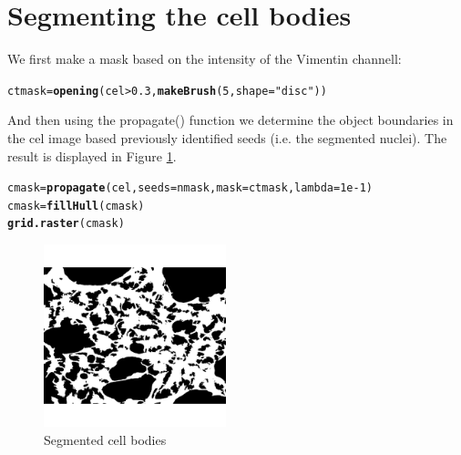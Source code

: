 \documentclass{article}\usepackage[]{graphicx}\usepackage[]{color}
\makeatletter
\newcommand{\hlnum}[1]{\textcolor[rgb]{0.686,0.059,0.569}{#1}}%
\newcommand{\hlstr}[1]{\textcolor[rgb]{0.192,0.494,0.8}{#1}}%
\newcommand{\hlopt}[1]{\textcolor[rgb]{0,0,0}{#1}}%
\newcommand{\hlstd}[1]{\textcolor[rgb]{0.345,0.345,0.345}{#1}}%
\newcommand{\hlkwb}[1]{\textcolor[rgb]{0.69,0.353,0.396}{#1}}%
\newcommand{\hlkwc}[1]{\textcolor[rgb]{0.333,0.667,0.333}{#1}}%
\newcommand{\hlkwd}[1]{\textcolor[rgb]{0.737,0.353,0.396}{\textbf{#1}}}%
\newenvironment{kframe}{%
 \def\at@end@of@kframe{}%
 \ifinner\ifhmode%
  \def\at@end@of@kframe{\end{minipage}}%
  \begin{minipage}{\columnwidth}%
 \fi\fi%
 \def\FrameCommand##1{\hskip\@totalleftmargin \hskip-\fboxsep
 \colorbox{shadecolor}{##1}\hskip-\fboxsep
     \hskip-\linewidth \hskip-\@totalleftmargin \hskip\columnwidth}%
 \MakeFramed {\advance\hsize-\width
   \@totalleftmargin\z@ \linewidth\hsize
   \@setminipage}}%
 {\par\unskip\endMakeFramed%
 \at@end@of@kframe}
\newenvironment{knitrout}{}{} %
\makeatother
\begin{document}
\section{Segmenting the cell bodies}
We first make a mask based on the intensity of the Vimentin channell:
\begin{knitrout}
\color{fgcolor}\begin{kframe}
\begin{alltt}
\hlstd{ctmask} \hlkwb{=} \hlkwd{opening}\hlstd{(cel}\hlopt{>}\hlnum{0.3}\hlstd{,} \hlkwd{makeBrush}\hlstd{(}\hlnum{5}\hlstd{,} \hlkwc{shape}\hlstd{=}\hlstr{"disc"}\hlstd{))}
\end{alltt}
\end{kframe}
\end{knitrout}
And then using the propagate() function we determine the object boundaries in the cel image based previously identified seeds (i.e. the segmented nuclei). The result is displayed in Figure \ref{fig:cmask}.
\begin{knitrout}
\color{fgcolor}\begin{kframe}
\begin{alltt}
\hlstd{cmask} \hlkwb{=} \hlkwd{propagate}\hlstd{(cel,} \hlkwc{seeds}\hlstd{=nmask,} \hlkwc{mask}\hlstd{=ctmask,} \hlkwc{lambda}\hlstd{=}\hlnum{1e-1}\hlstd{)}
\hlstd{cmask} \hlkwb{=} \hlkwd{fillHull}\hlstd{(cmask)}
\hlkwd{grid.raster}\hlstd{(cmask)}
\end{alltt}
\end{kframe}\begin{figure}

{\centering \includegraphics[width=200px]{knit_figure/figcmask-1} 

}

\caption[Segmented cell bodies]{Segmented cell bodies\label{fig:cmask}}
\end{figure}


\end{knitrout}
\end{document}
